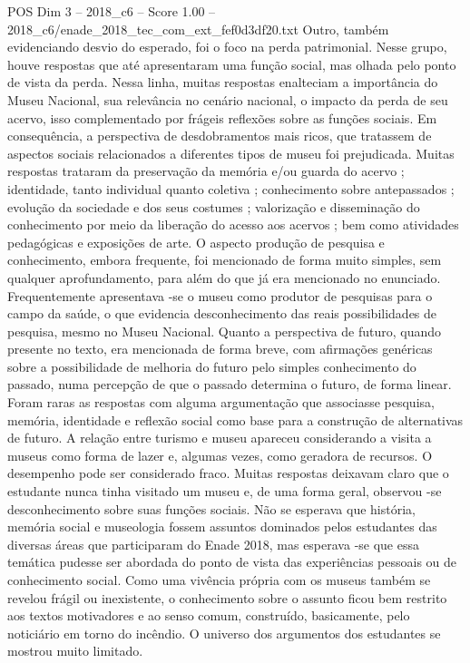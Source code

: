 \begin{textsample}{POS Dim 3 – 2018\_c6 – Score 1.00 – 2018\_c6/enade\_2018\_tec\_com\_ext\_fef0d3df20.txt}
Outro, também evidenciando desvio do esperado, foi o foco na perda patrimonial.
Nesse grupo, houve respostas que até apresentaram uma função social, mas olhada pelo ponto de vista da perda.
Nessa linha, muitas respostas enalteciam a importância do Museu Nacional, sua relevância no cenário nacional, o impacto da perda de seu acervo, isso complementado por frágeis reflexões sobre as funções sociais.
Em consequência, a perspectiva de desdobramentos mais ricos, que tratassem de aspectos sociais relacionados a diferentes tipos de museu foi prejudicada.
Muitas respostas trataram da preservação da memória e/ou guarda do acervo ; identidade, tanto individual quanto coletiva ; conhecimento sobre antepassados ; evolução da sociedade e dos seus costumes ; valorização e disseminação do conhecimento por meio da liberação do acesso aos acervos ; bem como atividades pedagógicas e exposições de arte.
O aspecto produção de pesquisa e conhecimento, embora frequente, foi mencionado de forma muito simples, sem qualquer aprofundamento, para além do que já era mencionado no enunciado.
Frequentemente apresentava -se o museu como produtor de pesquisas para o campo da saúde, o que evidencia desconhecimento das reais possibilidades de pesquisa, mesmo no Museu Nacional.
Quanto a perspectiva de futuro, quando presente no texto, era mencionada de forma breve, com afirmações genéricas sobre a possibilidade de melhoria do futuro pelo simples conhecimento do passado, numa percepção de que o passado determina o futuro, de forma linear.
Foram raras as respostas com alguma argumentação que associasse pesquisa, memória, identidade e reflexão social como base para a construção de alternativas de futuro.
A relação entre turismo e museu apareceu considerando a visita a museus como forma de lazer e, algumas vezes, como geradora de recursos.
O desempenho pode ser considerado fraco.
Muitas respostas deixavam claro que o estudante nunca tinha visitado um museu e, de uma forma geral, observou -se desconhecimento sobre suas funções sociais.
Não se esperava que história, memória social e museologia fossem assuntos dominados pelos estudantes das diversas áreas que participaram do Enade 2018, mas esperava -se que essa temática pudesse ser abordada do ponto de vista das experiências pessoais ou de conhecimento social.
Como uma vivência própria com os museus também se revelou frágil ou inexistente, o conhecimento sobre o assunto ficou bem restrito aos textos motivadores e ao senso comum, construído, basicamente, pelo noticiário em torno do incêndio.
O universo dos argumentos dos estudantes se mostrou muito limitado.

\end{textsample}
